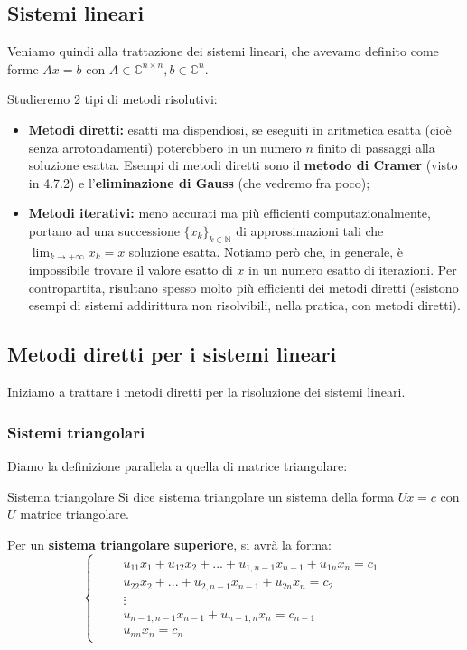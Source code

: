\documentclass[a4paper,11pt]{article}
\begin{document}
\subsection{Sistemi lineari}
Veniamo quindi alla trattazione dei sistemi lineari, che avevamo definito come forme $Ax = b$ con $A \in \mathbb{C}^{n \times n}, b \in \mathbb{C}^n$.

Studieremo 2 tipi di metodi risolutivi:
\begin{itemize}
	\item \textbf{Metodi diretti:} esatti ma dispendiosi, se eseguiti in aritmetica esatta (cioè senza arrotondamenti) poterebbero in un numero $n$ finito di passaggi alla soluzione esatta.
	Esempi di metodi diretti sono il \textbf{metodo di Cramer} (visto in 4.7.2) e l'\textbf{eliminazione di Gauss} (che vedremo fra poco);
	\item \textbf{Metodi iterativi:} meno accurati ma più efficienti computazionalmente, portano ad una successione $\{x_k\}_{k \in \mathbb{N}}$ di approssimazioni tali che $ \lim_{k \rightarrow +\infty} x_k = x$ soluzione esatta. Notiamo però che, in generale, è impossibile trovare il valore esatto di $x$ in un numero esatto di iterazioni. Per contropartita, risultano spesso molto più efficienti dei metodi diretti (esistono esempi di sistemi addirittura non risolvibili, nella pratica, con metodi diretti). 
\end{itemize}

\subsection{Metodi diretti per i sistemi lineari}
Iniziamo a trattare i metodi diretti per la risoluzione dei sistemi lineari.

\subsubsection{Sistemi triangolari}
Diamo la definizione parallela a quella di matrice triangolare:
\begin{definition}{Sistema triangolare}
	Si dice sistema triangolare un sistema della forma $Ux = c$ con $U$ matrice triangolare.
\end{definition}

Per un \textbf{sistema triangolare superiore}, si avrà la forma:
\[
\begin{cases}
    \begin{aligned}
			&& u_{11} x_1 + u_{12} x_2 + ... + u_{1,n-1} x_{n-1} + u_{1n} x_n = c_1 \\
			&&              u_{22} x_2 + ... + u_{2,n-1} x_{n-1} + u_{2n} x_n = c_2 \\
			&& \vdots \\
			&&                                 u_{n-1,n-1} x_{n-1} + u_{n-1,n} x_n = c_{n-1} \\
			&&                                                     u_{nn} x_n = c_n
		\end{aligned}
\end{cases}
\]
\end{document}

